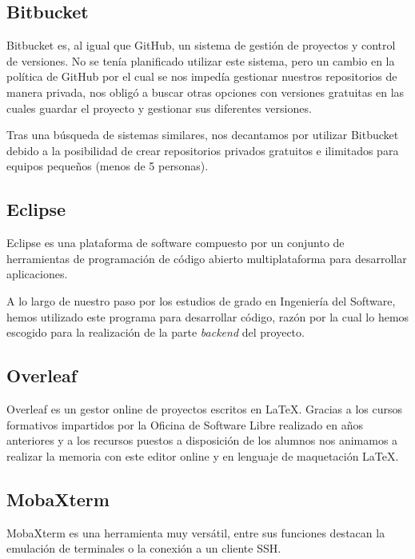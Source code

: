      \subsection{Bitbucket}
     Bitbucket\cite{bitbucket} es, al igual que GitHub, un sistema de gestión de proyectos y control de versiones. No se tenía planificado utilizar este sistema, pero un cambio en la política de GitHub por el cual se nos impedía gestionar nuestros repositorios de manera privada, nos obligó a buscar otras opciones con versiones gratuitas en las cuales guardar el proyecto y gestionar sus diferentes versiones.
     \newline
     
     Tras una búsqueda de sistemas similares, nos decantamos por utilizar Bitbucket debido a la posibilidad de crear repositorios privados gratuitos e ilimitados para equipos pequeños (menos de 5 personas).
     
     \subsection{Eclipse}
     Eclipse\cite{eclipse} es una plataforma de software compuesto por un conjunto de herramientas de programación de código abierto multiplataforma para desarrollar aplicaciones.
     \newline
     
     A lo largo de nuestro paso por los estudios de grado en Ingeniería del Software, hemos utilizado este programa para desarrollar código, razón por la cual lo hemos escogido para la realización de la parte \textit{backend} del proyecto.
     
     
     \subsection{Overleaf}
     Overleaf\cite{overleaf} es un gestor online de proyectos escritos en \LaTeX. Gracias a los cursos formativos impartidos por la Oficina de Software Libre\cite{ucmsoftwarelibre} realizado en años anteriores y a los recursos puestos a disposición de los alumnos\cite{recursoslatex} nos animamos a realizar la memoria con este editor online y en lenguaje de maquetación \LaTeX.
     
     
         \subsection{MobaXterm}
     MobaXterm\cite{mobaxterm} es una herramienta muy versátil, entre sus funciones destacan la emulación de terminales o la conexión a un cliente SSH.
     \newline 
     
